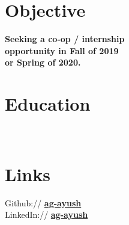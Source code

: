 \documentclass[]{deedy-resume-openfont}
\begin{document}
%
%
\lastupdated

%
%

%
%

\begin{minipage}[t]{0.30\textwidth}


\section{Objective}
\textbf{Seeking a co-op / internship \\
opportunity in Fall of 2019 \\
or Spring of 2020.}


\section{Education}

 \\


\section{Links}
Github:// \href{https://github.com/ayush}{\bf ag-ayush} \\
LinkedIn://  \href{https://www.linkedin.com/in/ag-ayush}{\bf ag-ayush} \\



\end{minipage}
\end{document}
